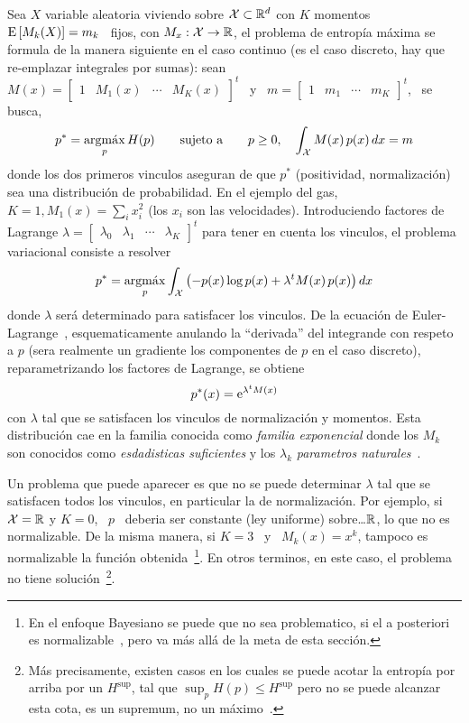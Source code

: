 Sea $X$ variable aleatoria viviendo  sobre $\mathcal{X} \subset \mathbb{R}^d$ con $K$ momentos
\  $\operatorname{E}\left[ M_k(X)  \right]  = m_k$  \ fijos,  con  $M_x: \mathcal{X}  \to \mathbb{R}$,  el
problema  de entrop\'ia  m\'axima se  formula de  la manera  siguiente en  el caso
continuo (es el caso discreto, hay que re-emplazar integrales por sumas): sean \
$M(x) = \begin{bmatrix} 1  & M_1(x) & \cdots & M_K(x) \end{bmatrix}^t$  \ y \ $m
= \begin{bmatrix} 1 & m_1 & \cdots & m_K \end{bmatrix}^t$, \ se busca,
%
\[
p^* = \operatorname*{argm\acute{a}x}_p H(p) \qquad \mbox{sujeto a} \qquad p \ge 0, \quad \int_{\mathcal{X}} M(x)
\, p(x) \, dx = m
\]
%
donde   los  dos  primeros   vinculos  aseguran   de  que   $p^*$  (positividad,
normalizaci\'on) sea una distribuci\'on de  probabilidad. En el ejemplo del gas,
$K =  1, M_1(x) = \sum_i  x_i^2$ (los $x_i$ son  las velocidades). Introduciendo
factores de Lagrange $\lambda = \begin{bmatrix} \lambda_0 & \lambda_1 & \cdots &
  \lambda_K  \end{bmatrix}^t$ para  tener en  cuenta los  vinculos,  el problema
variacional   consiste  a   resolver~\cite{GelFom63,  Bru04,   Mil00,  CamMar09,
  CovTho06}
%
\[
p^* = \operatorname*{argm\acute{a}x}_p \int_{\mathcal{X}} \left( - p(x) \log p(x) + \lambda^t M(x) \, p(x) \right)
dx
\]
%
donde  $\lambda$  ser\'a  determinado  para  satisfacer  los  vinculos.   De  la
ecuaci\'on  de Euler-Lagrange~\cite{GelFom63, Bru04},  esquematicamente anulando
la ``derivada''  del integrande con respeto  a $p$ (sera  realmente un gradiente
los componentes  de $p$ en el  caso discreto), reparametrizando  los factores de
Lagrange, se obtiene
%
\[
p^*(x) = \operatorname{e}^{\lambda^t M(x)}
\]
%
con $\lambda$ tal que se  satisfacen los vinculos de normalizaci\'on y momentos.
Esta distribuci\'on  cae en la  familia conocida como {\it  familia exponencial}
donde  los  $M_k$  son  conocidos  como {\it  esdadisticas  suficientes}  y  los
$\lambda_k$  {\it   parametros  naturales}~\cite{Dar35,  Koo36,   And70,  Kay93,
  LehCas98, Rob07}.

Un problema que  puede aparecer es que no se puede  determinar $\lambda$ tal que
se  satisfacen todos  los vinculos,  en particular  la de  normalizaci\'on.  Por
ejemplo, si $\mathcal{X} = \mathbb{R}$ y $K = 0$, \ $p$ \ deberia ser constante (ley uniforme)
sobre\ldots $\mathbb{R}$, lo que no es normalizable. De la misma manera, si $K = 3$ \
y \ $M_k(x)  = x^k$, tampoco es normalizable  la funci\'on obtenida~\footnote{En
  el enfoque Bayesiano  se puede que no sea problematico, si  el a posteriori es
  normalizable~\cite{Rob07}, pero va m\'as all\'a  de la meta de esta secci\'on.}.
En otros terminos,  en este caso, el problema  no tiene soluci\'on~\footnote{M\'as
  precisamente,  existen casos en  los cuales  se puede  acotar la  entrop\'ia por
  arriba por un $H^{\sup}$, tal que  $\sup_p H(p) \le H^{\sup}$ pero no se puede
  alcanzar     esta     cota,     \ie      es     un     supremum,     no     un
  m\'aximo~\cite[sec.~12.3]{CovTho06}.}.

